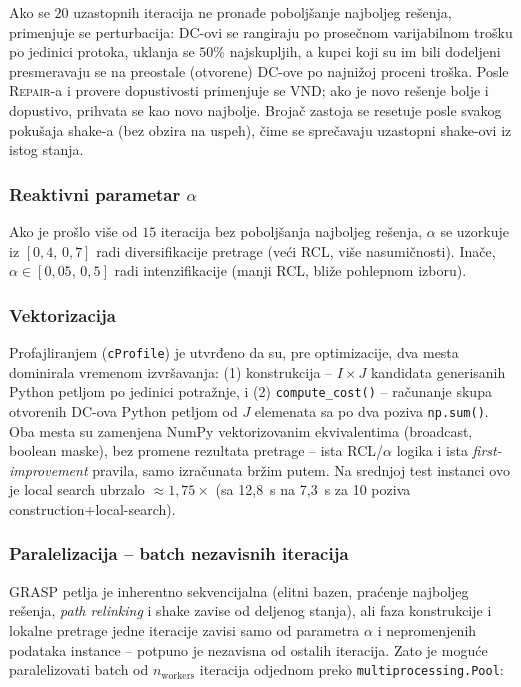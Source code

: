 \documentclass[12pt,a4paper]{article}
\begin{document}
Ako se $20$ uzastopnih iteracija ne pronađe poboljšanje najboljeg rešenja,
primenjuje se perturbacija: DC-ovi se rangiraju po prosečnom varijabilnom
trošku po jedinici protoka, uklanja se $50\%$ najskupljih, a kupci koji su
im bili dodeljeni presmeravaju se na preostale (otvorene) DC-ove po
najnižoj proceni troška. Posle \textsc{Repair}-a i provere dopustivosti
primenjuje se VND; ako je novo rešenje bolje i dopustivo, prihvata se kao
novo najbolje. Brojač zastoja se resetuje posle svakog pokušaja shake-a
(bez obzira na uspeh), čime se sprečavaju uzastopni shake-ovi iz istog stanja.

\subsubsection{Reaktivni parametar $\alpha$}

Ako je prošlo više od $15$ iteracija bez poboljšanja najboljeg rešenja,
$\alpha$ se uzorkuje iz $[0{,}4,\, 0{,}7]$ radi diversifikacije pretrage
(veći RCL, više nasumičnosti). Inače, $\alpha \in [0{,}05,\, 0{,}5]$ radi
intenzifikacije (manji RCL, bliže pohlepnom izboru).

\subsubsection{Vektorizacija}

Profajliranjem (\texttt{cProfile}) je utvrđeno da su, pre optimizacije,
dva mesta dominirala vremenom izvršavanja: (1) konstrukcija -- $I \times J$
kandidata generisanih Python petljom po jedinici potražnje, i (2)
\texttt{compute\_cost()} -- računanje skupa otvorenih DC-ova Python petljom
od $J$ elemenata sa po dva poziva \texttt{np.sum()}. Oba mesta su zamenjena
NumPy vektorizovanim ekvivalentima (broadcast, boolean maske), 
bez promene rezultata pretrage -- ista RCL/$\alpha$ logika
i ista \textit{first-improvement} pravila, samo izračunata bržim putem.
Na srednjoj test instanci ovo je local search ubrzalo $\approx 1{,}75\times$
(sa 12{,}8~s na 7{,}3~s za 10 poziva construction+local-search).

\subsubsection{Paralelizacija -- batch nezavisnih iteracija}

GRASP petlja je inherentno sekvencijalna (elitni bazen, praćenje
najboljeg rešenja, \textit{path relinking} i shake zavise od deljenog
stanja), ali faza konstrukcije i lokalne pretrage jedne iteracije zavisi
samo od parametra $\alpha$ i nepromenjenih podataka instance -- potpuno je
nezavisna od ostalih iteracija. Zato je moguće paralelizovati batch od
$n_{\text{workers}}$ iteracija odjednom preko \texttt{multiprocessing.Pool}:
\end{document}
